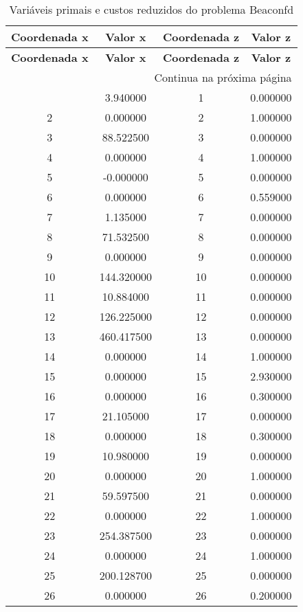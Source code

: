 \documentclass[12pt]{article}
\begin{document}
\begin{longtable}{@{}cccc@{}}
\caption{Variáveis primais e custos reduzidos do problema Beaconfd} \\
\toprule
\textbf{Coordenada x} & \textbf{Valor x} & \textbf{Coordenada z} & \textbf{Valor z} \\
\midrule
\endfirsthead

\toprule
\textbf{Coordenada x} & \textbf{Valor x} & \textbf{Coordenada z} & \textbf{Valor z} \\
\midrule
\endhead

\midrule \multicolumn{4}{r}{{Continua na próxima página}} \\ \midrule
\endfoot

\bottomrule
\endlastfoot
1 & 3.940000 & 1 & 0.000000 \\
2 & 0.000000 & 2 & 1.000000 \\
3 & 88.522500 & 3 & 0.000000 \\
4 & 0.000000 & 4 & 1.000000 \\
5 & -0.000000 & 5 & 0.000000 \\
6 & 0.000000 & 6 & 0.559000 \\
7 & 1.135000 & 7 & 0.000000 \\
8 & 71.532500 & 8 & 0.000000 \\
9 & 0.000000 & 9 & 0.000000 \\
10 & 144.320000 & 10 & 0.000000 \\
11 & 10.884000 & 11 & 0.000000 \\
12 & 126.225000 & 12 & 0.000000 \\
13 & 460.417500 & 13 & 0.000000 \\
14 & 0.000000 & 14 & 1.000000 \\
15 & 0.000000 & 15 & 2.930000 \\
16 & 0.000000 & 16 & 0.300000 \\
17 & 21.105000 & 17 & 0.000000 \\
18 & 0.000000 & 18 & 0.300000 \\
19 & 10.980000 & 19 & 0.000000 \\
20 & 0.000000 & 20 & 1.000000 \\
21 & 59.597500 & 21 & 0.000000 \\
22 & 0.000000 & 22 & 1.000000 \\
23 & 254.387500 & 23 & 0.000000 \\
24 & 0.000000 & 24 & 1.000000 \\
25 & 200.128700 & 25 & 0.000000 \\
26 & 0.000000 & 26 & 0.200000 \\

\end{longtable}
\end{document}
